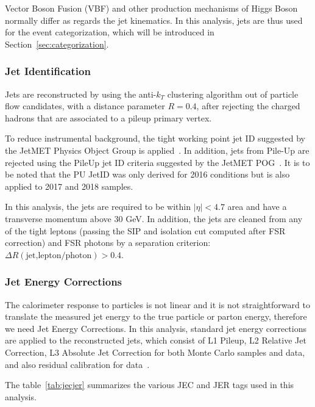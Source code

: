 Vector Boson Fusion (VBF) and other production mechanisms of Higgs Boson normally differ as regards the jet kinematics. 
In this analysis, jets are thus used for the event categorization, which will be introduced in Section~\ref{sec:categorization}.

\subsubsection{Jet Identification}

Jets are reconstructed by using the anti-$k_T$ clustering algorithm out of particle flow candidates, with a distance parameter $R = 0.4$, 
after rejecting the charged hadrons that are associated to a pileup primary  vertex.

To reduce instrumental background, the tight working point jet ID suggested by the JetMET Physics Object Group is applied~\cite{JetID2018}. 
In addition, jets from Pile-Up are rejected using the PileUp jet ID criteria suggested by the JetMET POG~\cite{JetPUID2017}.
It is to be noted that the PU JetID was only derived for 2016 conditions but is also applied to 2017 and 2018 samples. 
 
In this analysis, the jets are required to be within $|\eta| < 4.7$ area and have a transverse momentum above 30 GeV. 
In addition, the jets are cleaned from any of the tight leptons (passing the SIP and isolation cut computed after FSR correction) 
and FSR photons by a separation criterion: $\Delta R(\text{jet,lepton/photon}) > 0.4$.

\subsubsection{Jet Energy Corrections}

The calorimeter response to particles is not linear
and it is not straightforward to translate the measured jet energy
to the true particle or parton energy, therefore we need Jet Energy Corrections.
In this analysis, standard jet energy corrections are applied to the reconstructed jets,
which consist of L1 Pileup, L2 Relative Jet Correction,
L3 Absolute Jet Correction for both Monte Carlo samples and data,
and also residual calibration for data~\cite{JECMC2018}.

The table~\ref{tab:jecjer} summarizes the various JEC and JER tags used in this analysis.

